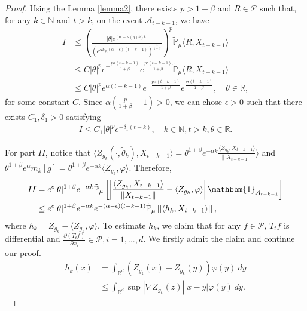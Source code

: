 \documentclass{article}
\begin{document}
\begin{proof}
    Using the Lemma \ref{lemma2}, there exists $p>1+\beta$ and $R \in \mathcal{P}$ such that, for any $k\in \mathbb{N}$ and $t>k$, on the event $\mathcal{A}_{t-k-1}$, we have 
    \begin{align*}
        I&\leq \left(\frac{|\theta|e^{(\alpha-\kappa(g)b)k}}{(e^{\alpha k}e^{(\alpha-\epsilon)(t-k-1)})^\frac{1}{1+\beta}}\right)^p\mathbb{\tilde{P}}_{\mu}\langle R,X_{t-k-1}\rangle\\
        &\leq C |\theta|^p e^{-\frac{p\alpha(t-k-1)}{1+\beta}}e^{\frac{p\epsilon(t-k-1)}{1+\beta}}\mathbb{\tilde{P}}_{\mu}\langle R,X_{t-k-1}\rangle\\
        &\leq C |\theta|^p e^{\alpha(t-k-1)}e^{-\frac{p\alpha(t-k-1)}{1+\beta}}e^{\frac{p\epsilon(t-k-1)}{1+\beta}},\quad \theta\in \mathbb{R},
    \end{align*}
    for some constant $C$. Since $\alpha(\frac{p}{1+\beta}-1)>0$, we can chose $\epsilon>0$ such that there exists $C_1,\delta_1>0$ satisfying  
    \begin{align}
        I\leq C_1|\theta|^p e^{-\delta_1(t-k)}, \quad k\in \mathbb{N}, t>k, \theta \in \mathbb{R}.\label{lemma31q}
    \end{align}
    
    For part $II$, notice that $\langle Z_{g_k}(\cdot,\tilde{\theta}_k),X_{t-k-1}\rangle=\theta^{1+\beta}e^{-\alpha k}\frac{\langle Z_{g_k},X_{t-k-1}\rangle}{\|X_{t-k-1}\|} \rangle$ and $\theta^{1+\beta}e^{\alpha}m_k[g]=\theta^{1+\beta}e^{-\alpha k}\langle Z_{g_k},\varphi\rangle$. Therefore,
\begin{align}
    II&=e^c|\theta|^{1+\beta}e^{-\alpha k}\mathbb{\tilde{P}}_{\mu}\left[\left|\frac{\langle Z_{g_k},X_{t-k-1}\rangle}{\|X_{t-k-1}\|}-\langle Z_{g_k},\varphi\rangle\right|\mathbbm{1}_{\mathcal{A}_{t-k-1}}\right]\nonumber\\
    &\leq e^c|\theta|^{1+\beta}e^{-\alpha k}e^{-(\alpha-\epsilon)(t-k-1)}\mathbb{\tilde{P}}_{\mu}\left[\left|\langle h_k,X_{t-k-1}\rangle\right|\right],\label{II1}
\end{align}
    where $h_k=Z_{g_k}-\langle Z_{g_k}, \varphi\rangle$. To estimate $h_k$, we claim that for any $f \in \mathcal{P}$, $T_t f$ is differential and $\frac{\partial (T_t f)}{\partial x_i} \in \mathcal{P}, i=1,...,d$. We firstly admit the claim and continue our proof.
    \begin{align*}
        h_k(x)&=\int_{\mathbb{R}^d}(Z_{g_k}(x)-Z_{g_k}(y))\varphi(y)~dy\\
        &\leq\int_{\mathbb{R}^d} \sup|\nabla Z_{g_k}(z)||x-y|\varphi(y)~dy.
    \end{align*}
    

\end{proof}
\end{document}

